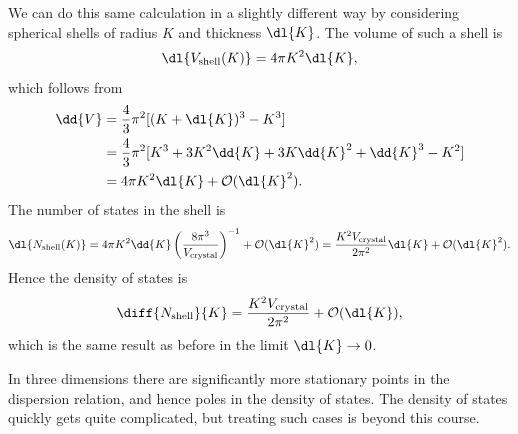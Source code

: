 \documentclass[fleqn]{NotesClass}
\newcommand*{\order}{\mathcal{O}}
\begin{document}
    We can do this same calculation in a slightly different way by considering spherical shells of radius \(K\) and thickness \(\dl{K}\).
    The volume of such a shell is
    \begin{equation}
        \dl{V_{\mathrm{shell}}(K)} = 4\pi K^2 \dl{K},
    \end{equation}
    which follows from
    \begin{align}
        \dd{V} &= \frac{4}{3}\pi^2 [(K + \dl{K})^3 - K^3]\\
        &= \frac{4}{3}\pi^2[K^3 + 3K^2\dd{K} + 3K\dd{K}^2 + \dd{K}^3 - K^2]\\
        &= 4\pi K^2 \dl{K} + \order(\dl{K}^2).
    \end{align}
    The number of states in the shell is 
    \begin{equation}
        \dl{N_{\mathrm{shell}}(K)} = 4\pi K^2\dd{K} \left( \frac{8\pi^3}{V_{\mathrm{crystal}}} \right)^{-1} + \order(\dl{K}^2) = \frac{K^2V_{\mathrm{crystal}}}{2\pi^2} \dl{K} + \order(\dl{K}^2).
    \end{equation}
    Hence the density of states is
    \begin{equation}
        \diff{N_{\mathrm{shell}}}{K} = \frac{K^2V_{\mathrm{crystal}}}{2\pi^2} + \order(\dl{K}),
    \end{equation}
    which is the same result as before in the limit \(\dl{K} \to 0\).
    
    In three dimensions there are significantly more stationary points in the dispersion relation, and hence poles in the density of states.
    The density of states quickly gets quite complicated, but treating such cases is beyond this course.
    
\end{document}
